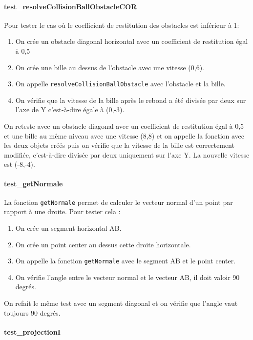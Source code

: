 \documentclass{report}
\begin{document}
\paragraph{test\_resolveCollisionBallObstacleCOR}

Pour tester le cas où le coefficient de restitution des obstacles est inférieur à 1:

\begin{enumerate}
\item On crée un obstacle diagonal horizontal avec un coefficient de restitution égal à 0,5
\item On crée une bille au dessus de l’obstacle avec une vitesse (0,6).
\item On appelle \texttt{resolveCollisionBallObstacle} avec l’obstacle et la bille.
\item On vérifie que la vitesse de la bille après le rebond a été divisée par deux sur l’axe de Y c’est-à-dire égale à (0,-3).
\end{enumerate}

On reteste avec un obstacle diagonal avec un coefficient de restitution égal à 0,5 et une bille au même niveau avec une vitesse (8,8) et on appelle la fonction avec les deux objets créés puis on vérifie que la vitesse de la bille est correctement modifiée, c’est-à-dire divisée par deux uniquement sur l’axe Y. La nouvelle vitesse est (-8,-4).

\paragraph{test\_getNormale}

La fonction \texttt{getNormale} permet de calculer le vecteur normal d’un point par rapport à une droite. Pour tester cela :

\begin{enumerate}
\item On crée un segment horizontal AB.
\item On crée un point center au dessus cette droite horizontale.
\item On appelle la fonction \texttt{getNormale} avec le segment AB et le point center.
\item On vérifie l’angle entre le vecteur normal et le vecteur AB, il doit valoir 90 degrés.
\end{enumerate}

On refait le même test avec un segment diagonal et on vérifie que l’angle vaut toujours 90 degrés.

\paragraph{test\_projectionI}
\end{document}
